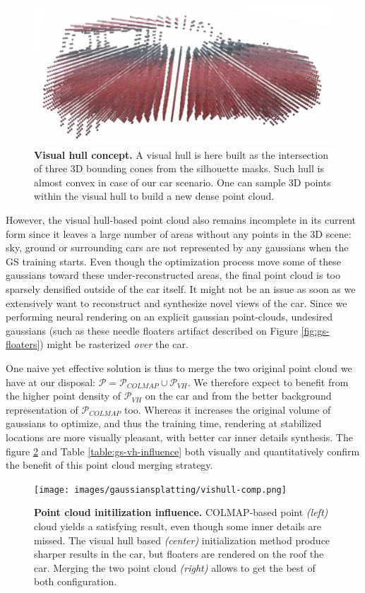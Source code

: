\begin{figure}[htb!]
  \center
\includegraphics[width=.7\linewidth]{images/gaussiansplatting/visualhull-res.png}
\caption{\textbf{Visual hull concept.} A visual hull is here built as the intersection of three 3D bounding cones from the silhouette masks. Such hull is almost convex in case of our car scenario. One can  sample 3D points within the visual hull to build a new dense point cloud.}
\label{fig:gs-vh-result}
\end{figure}

However, the visual hull-based point cloud also remains incomplete in its current form since it leaves a large number of areas without any points in the 3D scene: sky, ground or surrounding cars are not represented by any gaussians when the \ac{GS} training starts. Even though the optimization process move some of these gaussians toward these under-reconstructed areas, the final point cloud is too sparsely densified outside of the car itself. It might not be an issue as soon as we extensively want to reconstruct and synthesize novel views of the car. Since we performing neural rendering on an explicit gaussian point-clouds, undesired gaussians (such as these needle floaters artifact described on Figure \ref{fig:gs-floaters}) might be rasterized \textit{over} the car.  

One naive yet effective solution is thus to merge the two original point cloud we have at our disposal: $\mathcal{P} = \mathcal{P}_{COLMAP} \cup \mathcal{P}_{VH}$. We therefore expect to benefit from the higher point density of $\mathcal{P}_{VH}$ on the car and from the better background representation of $\mathcal{P}_{COLMAP}$ too. Whereas it increases the original volume of gaussians to optimize, and thus the training time, rendering at stabilized locations are more visually pleasant, with better car inner details synthesis. The figure \ref{fig:gs-vishull-comp} and Table \ref{table:gs-vh-influence} both visually and quantitatively confirm the benefit of this point cloud merging strategy. 

\begin{figure}[htb!]
  \center
\texttt{[image: images/gaussiansplatting/vishull-comp.png]}
\caption{\textbf{Point cloud initilization influence.} COLMAP-based point \textit{(left)} cloud yields a satisfying result, even though some inner details are missed. The visual hull based \textit{(center)} initialization method produce sharper results in the car, but floaters are rendered on the roof the car. Merging the two point cloud \textit{(right)} allows to get the best of both configuration.}
\label{fig:gs-vishull-comp}
\end{figure}


